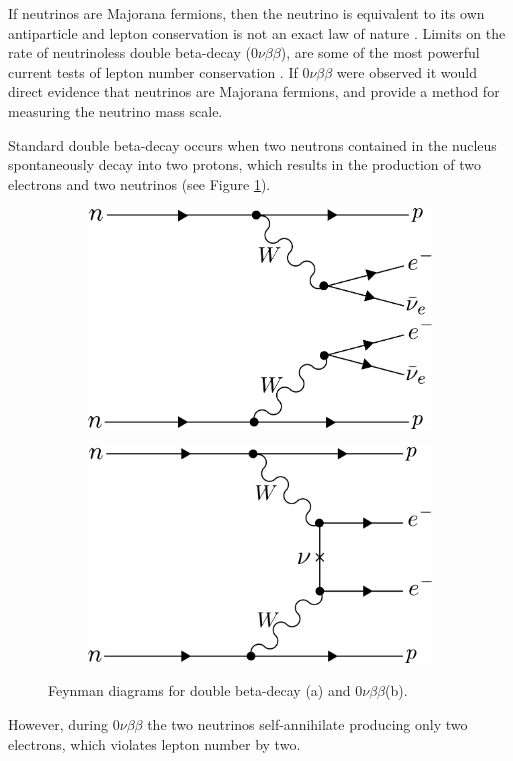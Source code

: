 If neutrinos are Majorana fermions, then the neutrino is equivalent to its own antiparticle and lepton conservation is not an exact law of nature \cite{double_beta1}. Limits on the rate of neutrinoless double beta-decay ($0\nu\beta\beta$), are some of the most powerful current tests of lepton number conservation \cite{Workman:2022ynf}. If $0\nu\beta\beta$ were observed it would direct evidence that neutrinos are Majorana fermions, and provide a method for measuring the neutrino mass scale.

Standard double beta-decay occurs when two neutrons contained in the nucleus spontaneously decay into two protons, which results in the production of two electrons and two neutrinos (see Figure \ref{fig:chap2-0nubetabeta-diagram}).  
\begin{figure}[htbp]
    \centering
    \begin{subfigure}{0.4\textwidth}
        \includegraphics*[width=\textwidth]{figs/Chapter-2/230717_2nubetabeta.png}
        \caption{}
    \end{subfigure}
    \begin{subfigure}{0.4\textwidth}
        \includegraphics*[width=\textwidth]{figs/Chapter-2/230717_0nubetabeta.png}
        \caption{}
    \end{subfigure}
    \caption{\label{fig:chap2-0nubetabeta-diagram} Feynman diagrams for double beta-decay (a) and $0\nu\beta\beta$(b).}
\end{figure}
However, during $0\nu\beta\beta$ the two neutrinos self-annihilate producing only two electrons, which violates lepton number by two. 

